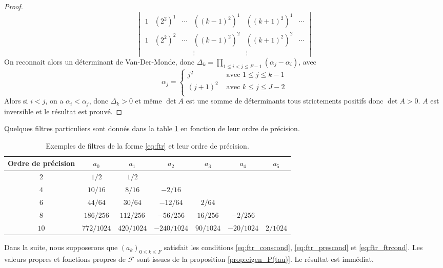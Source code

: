 \begin{proof}
\begin{equation}
\begin{vmatrix}
1 & (2^2)^1 & \cdots & ((k-1)^2)^1 & ((k+1)^2)^1 & \cdots\\
1 & (2^2)^2 & \cdots & ((k-1)^2)^2 & ((k+1)^2)^2 & \cdots\\
&&& \vdots &  \vdots &
\end{vmatrix}
\end{equation}
On reconnait alors un déterminant de Van-Der-Monde, donc $\Delta_k = \prod_{1 \leq i < j \leq F-1} \left( \alpha_j - \alpha_i \right)$, avec 
\begin{equation}
\alpha_j = \left\lbrace
\begin{array}{ll}
j^2 & \text{ avec } 1 \leq j \leq k-1\\
(j+1)^2 & \text{ avec } k \leq j \leq J-2\\
\end{array}
\right.
\end{equation}
Alors si $i<j$, on a $\alpha_i < \alpha_j$, donc $\Delta_k>0$ et même $\det A$ est une somme de déterminants tous strictements positifs donc $\det A > 0$. $A$ est inversible et le résultat est prouvé.
\end{proof}
Quelques filtres particuliers sont donnés dans la table \ref{tab:filter} en fonction de leur ordre de précision.

\begin{table}[htbp]
\begin{center}
\begin{tabular}{|c||cccccc|}
\hline
\textbf{Ordre de précision} & $a_0$ & $a_1$ & $a_2$ & $a_3$ & $a_4$ & $a_5$ \\
\hline \hline
$2$ & $1/2$ & $1/2$ & & & & \\
\hline
$4$ & $10/16$ & $8/16$ & $-2/16$ & & & \\
\hline
$6$ & $44/64$ & $30/64$ & $-12/64$ & $2/64$ & & \\
\hline
$8$ & $186/256$ & $112/256$ & $-56/256$ & $16/256$ & $-2/256$ & \\
\hline
$10$ & $772/1024$ & $420/1024$ & $-240/1024$ & $90/1024$ & $-20/1024$ & $2/1024$ \\
\hline
\end{tabular}
\end{center}
\caption{Exemples de filtres de la forme \eqref{eq:ftr} et leur ordre de précision.}
\label{tab:filter}
\end{table}

Dans la suite, nous supposerons que $(a_k)_{0 \leq k \leq F}$ satisfait les conditions \eqref{eq:ftr_conscond}, \eqref{eq:ftr_prescond} et \eqref{eq:ftr_ftrcond}.
Les valeurs propres et fonctions propres de $\mathcal{F}$ sont issues de la proposition \ref{prop:eigen_P(tau)}. Le résultat est immédiat.


